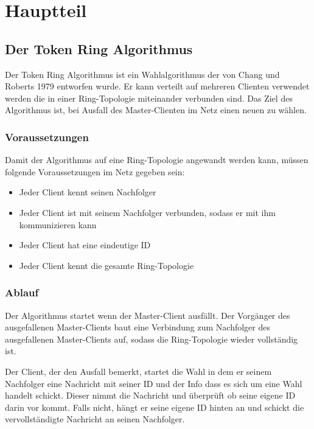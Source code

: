 \section{Hauptteil} 

\subsection{Der Token Ring Algorithmus}
Der Token Ring Algorithmus ist ein Wahlalgorithmus der von Chang und Roberts 1979 entworfen wurde. Er kann verteilt auf mehreren Clienten verwendet werden die in einer Ring-Topologie miteinander verbunden sind. Das Ziel des Algorithmus ist, bei Ausfall des Master-Clienten im Netz einen neuen zu wählen.

\subsubsection*{Voraussetzungen}
Damit der Algorithmus auf eine Ring-Topologie angewandt werden kann, müssen folgende Voraussetzungen im Netz gegeben sein:
\begin{itemize}
	\item Jeder Client kennt seinen Nachfolger
	\item Jeder Client ist mit seinem Nachfolger verbunden, sodass er mit ihm kommunizieren kann
	\item Jeder Client hat eine eindeutige ID
	\item Jeder Client kennt die gesamte Ring-Topologie
\end{itemize}

\subsubsection*{Ablauf}
\label{sec:algorithm_process}
Der Algorithmus startet wenn der Master-Client ausfällt. Der Vorgänger des ausgefallenen Master-Clients baut eine Verbindung zum Nachfolger des ausgefallenen Master-Clients auf, sodass die Ring-Topologie wieder vollständig ist.

Der Client, der den Ausfall bemerkt, startet die Wahl in dem er seinem Nachfolger eine Nachricht mit seiner ID und der Info dass es sich um eine Wahl handelt schickt. Dieser nimmt die Nachricht und überprüft ob seine eigene ID darin vor kommt. Falls nicht, hängt er seine eigene ID hinten an und schickt die vervollständigte Nachricht an seinen Nachfolger.


